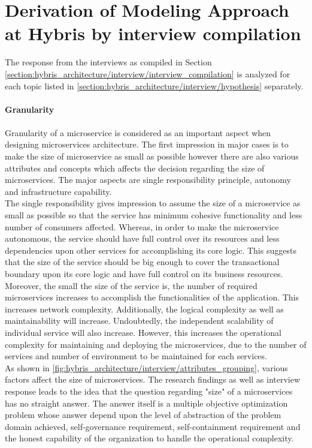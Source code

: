  \section{Derivation of Modeling Approach at Hybris by interview compilation}\label{section:hybris_architecture/interview_summary}
 The response from the interviews as compiled in Section \ref{section:hybris_architecture/interview/interview_compilation} is analyzed for each topic listed in \ref{section:hybris_architecture/interview/hypothesis} separately.
 \\
 \\
 \textbf{Granularity}
 \\
 \\
Granularity of a microservice is considered as an important aspect when designing microservices architecture. The first impression in major cases is to make the size of microservice as small as possible however there are also various attributes and concepts which affects the decision regarding the size of microservices. The major aspects are single responsibility principle, autonomy and infrastructure capability.
\\
The single responsibility gives impression to assume the size of a microservice as small as possible so that the service has minimum cohesive functionality and less number of consumers affected. Whereas, in order to make the microservice autonomous, the service should have full control over its resources and less dependencies upon other services for accomplishing its core logic. This suggests that the size of the service should be big enough to cover the transactional boundary upon its core logic and have full control on its business resources. 
\\
Moreover, the small the size of the service is, the number of required microservices increases to accomplish the functionalities of the application. This increases network complexity. Additionally, the logical complexity as well as maintainability will increase. Undoubtedly, the independent scalability of individual service will also increase. However, this increases the operational complexity for maintaining and deploying the microservices, due to the number of services and number of environment to be maintained for each services.
\\
As shown in \ref{fig:hybris_architecture/interview/attributes_grouping}, various factors affect the size of microservices.
The research findings as well as interview response leads to the idea that the question regarding "size" of a microservices has no straight answer. The answer itself is a multiple objective optimization problem whose answer depend upon the level of abstraction of the problem domain achieved, self-governance requirement, self-containment requirement and the honest capability of the organization to handle the operational complexity.
